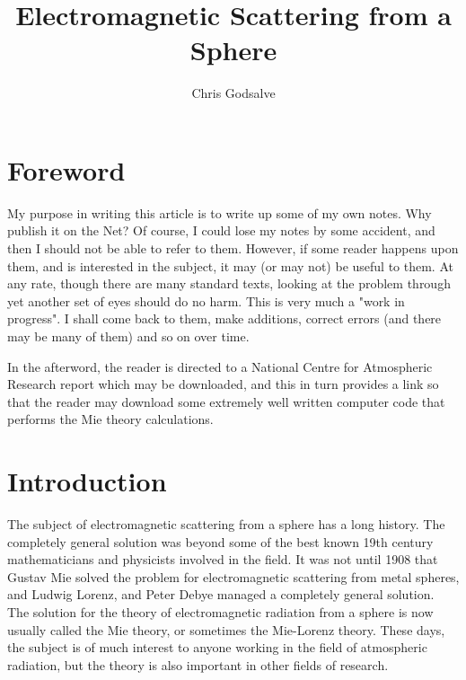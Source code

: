 \setlength{\textheight}{9.80in}
\setlength{\textwidth}{6.40in}
\setlength{\oddsidemargin}{0.0mm}
\setlength{\evensidemargin}{1.0mm}
\setlength{\topmargin}{-0.6in}
\setlength{\parindent}{0.2in}
\setlength{\parskip}{1.5ex}
\newtheorem{defn}{Definition}
\renewcommand{\baselinestretch}{1.2}






\thispagestyle{empty}

\title{Electromagnetic Scattering from a Sphere}
\author{Chris Godsalve}
\maketitle

\tableofcontents

\section{Foreword}

My purpose in writing this article is to write up some of my own notes. 
Why publish it on the Net? Of course, I could lose my notes by some 
accident, and then I should not be able to refer to them. However, if some
reader happens upon them, and is interested in the subject, it may (or may not)
 be useful to them. At any rate, though there are many standard texts, looking at the problem through yet another set of eyes should do no harm. This is very much a "work in progress". I shall come back to them, make additions, correct errors (and there may be many of them) and so on over time.

In the afterword, the reader is directed to a National Centre for Atmospheric Research report which may be downloaded, and this in turn provides a link so that the reader may download some extremely well written computer code that performs the Mie theory calculations.

\section{Introduction}

The subject of electromagnetic scattering from a sphere has a long history. The completely general solution was beyond some of the best known 19th century mathematicians and physicists involved in the field. It was not until 1908 that Gustav  Mie solved the problem for electromagnetic  scattering from metal spheres, and Ludwig Lorenz, and Peter Debye managed a completely general solution. The solution for the theory of electromagnetic radiation from a sphere is now usually called the Mie theory, or sometimes the Mie-Lorenz theory. These days, the subject is of much interest to anyone working in the field of atmospheric radiation, but the theory is also important in other fields of research.

